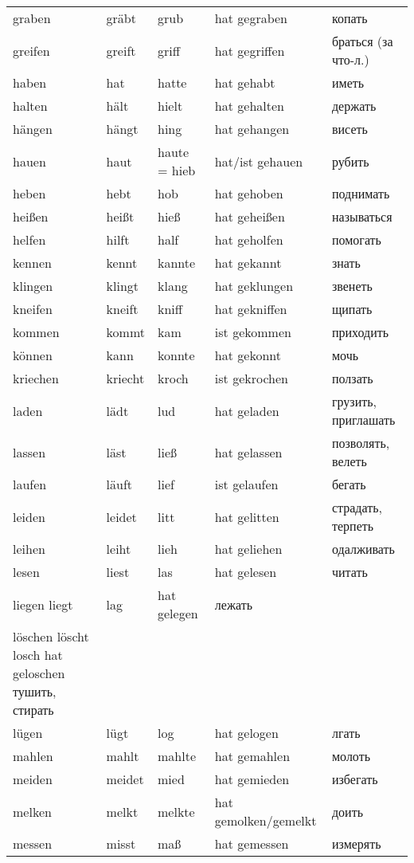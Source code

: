 \begin{longtable}{|l|l|l|l|l|}
graben & gr\"abt & grub & hat gegraben & копать \\
greifen & greift & griff & hat gegriffen & браться (за что-л.) \\
haben & hat & hatte & hat gehabt & иметь \\
halten & h\"alt & hielt & hat gehalten & держать \\
h\"angen & h\"angt & hing & hat gehangen & висеть \\
hauen & haut & haute = hieb & hat/ist gehauen & рубить \\
heben & hebt & hob & hat gehoben & поднимать \\
hei\ss en & hei\ss t & hie\ss  & hat gehei\ss en & называться \\
helfen & hilft & half & hat geholfen & помогать \\
kennen & kennt & kannte & hat gekannt & знать \\
klingen & klingt & klang & hat geklungen & звенеть \\
kneifen & kneift & kniff & hat gekniffen & щипать \\
kommen & kommt & kam & ist gekommen & приходить \\
k\"onnen & kann & konnte & hat gekonnt & мочь \\
kriechen & kriecht & kroch & ist gekrochen & ползать \\
laden & l\"adt & lud & hat geladen & грузить, приглашать \\
lassen & l\"ast & lie\ss  & hat gelassen & позволять, велеть \\
laufen & l\"auft & lief & ist gelaufen & бегать \\
leiden & leidet & litt & hat gelitten & страдать, терпеть \\
leihen & leiht & lieh & hat geliehen & одалживать \\
lesen & liest & las & hat gelesen & читать \\
liegen	liegt & lag & hat gelegen & лежать \\
l\"oschen	l\"oscht	losch	hat geloschen	тушить, стирать \\
l\"ugen & l\"ugt & log & hat gelogen & лгать \\
mahlen & mahlt & mahlte & hat gemahlen & молоть \\
meiden & meidet & mied & hat gemieden & избегать \\
melken & melkt & melkte & hat gemolken/gemelkt & доить \\
messen & misst & ma\ss  & hat gemessen & измерять \\

\end{longtable}
